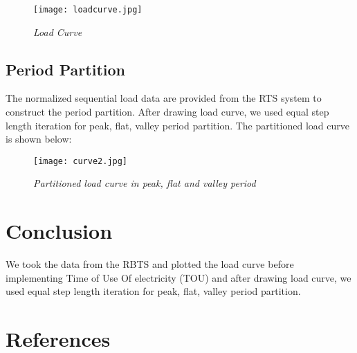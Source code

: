 \documentclass[14 pt]{article}
\begin{document}
\vspace{1cm}
\begin{figure}[H]
\centering
\texttt{[image: loadcurve.jpg]}
\caption{\textit{Load Curve}}
\end{figure}
\pagebreak
\subsection{Period Partition}
The normalized sequential load data are provided from the RTS system to construct
the period partition. After drawing load curve, we used equal step length iteration
for peak, flat, valley period partition. The partitioned load curve is shown below:
\begin{figure}[H]
\centering
\texttt{[image: curve2.jpg]}
\caption{\textit{Partitioned load curve in peak, flat and valley period}}
\end{figure}
\pagebreak
\section{Conclusion}
We took the data from the RBTS and plotted the load curve before implementing
Time of Use Of electricity (TOU) and after drawing load curve, we used equal step
length iteration for peak, flat, valley period partition.

\pagebreak
\cite{yang2012game}

\section*{References}  

\end{document}
